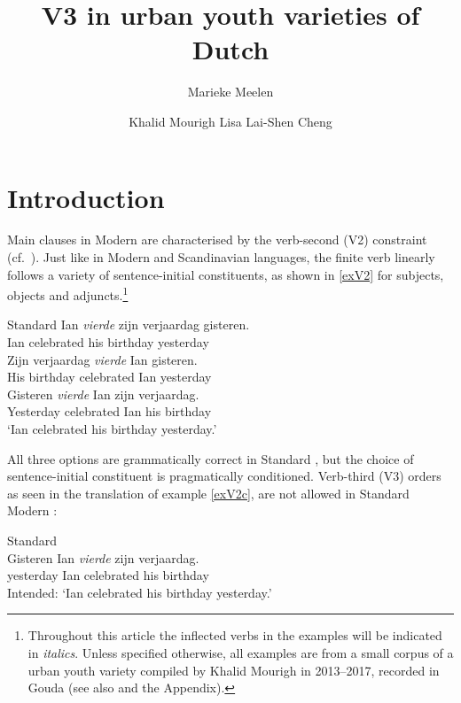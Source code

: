 \documentclass[output=paper]{langsci/langscibook}
\title{V3 in urban youth varieties of Dutch}
\author{Marieke Meelen\affiliation{University of Cambridge}\and
    Khalid Mourigh\affiliation{Leiden University}\lastand
    Lisa Lai-Shen Cheng \affiliation{Leiden University}}
\begin{document}
\glsresetall
\maketitle
\section{Introduction}\label{sec:intro}


Main clauses in Modern  are characterised by the verb-second
(V2) constraint (cf.\ \citealt{Zwart:1997}). Just like in Modern  and
Scandinavian languages, the finite verb linearly follows a variety of
sentence-initial constituents, as shown in \eqref{exV2} for subjects,
objects and adjuncts.\footnote{Throughout this article the inflected verbs in
    the examples will be indicated in \textit{italics}. Unless specified
    otherwise, all examples are from a small corpus of a  urban youth
    variety compiled by Khalid Mourigh in 2013--2017, recorded in Gouda (see
also  and the Appendix).}

\ea\label{exV2} Standard 
    \ea
    \gll Ian \textit{vierde} zijn verjaardag gisteren.\\
    Ian celebrated his birthday yesterday\\
    \ex
    \gll Zijn verjaardag \textit{vierde} Ian gisteren.\\
    His birthday celebrated Ian yesterday\\
    \ex
    \gll\label{exV2c}Gisteren \textit{vierde} Ian zijn verjaardag.\\
    Yesterday celebrated Ian his birthday\\
    \trans \enquote*{Ian celebrated his birthday yesterday.}
    \z
\z

\noindent All three options are grammatically correct in Standard , but
the choice of sentence-initial constituent is pragmatically conditioned.
Verb-third (V3) orders as seen in the  translation of example
\eqref{exV2c}, are not allowed in Standard Modern :

\begin{exe}             
\ex\label{exV3} Standard \\
    \gll \llap{*}Gisteren Ian \textit{vierde} zijn verjaardag.\\
yesterday Ian celebrated his birthday\\
\trans Intended: `Ian celebrated his birthday yesterday.'
\end{exe}             
\end{document}
